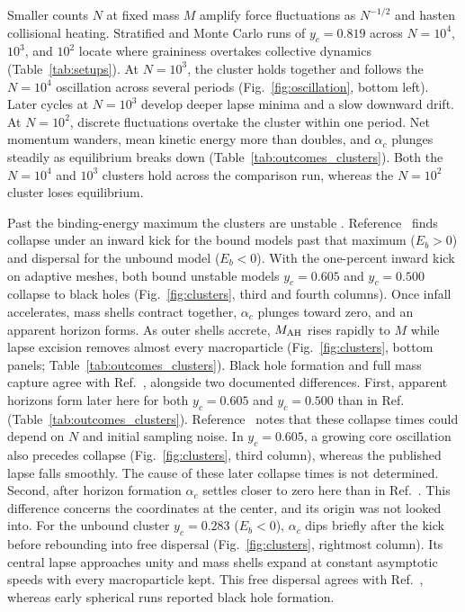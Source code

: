 Smaller counts $N$ at fixed mass $M$ amplify force fluctuations as $N^{-1/2}$ and hasten collisional heating. Stratified and Monte Carlo runs of $y_c = 0.819$ across $N = 10^4$, $10^3$, and $10^2$ locate where graininess overtakes collective dynamics (Table~\ref{tab:setups}). At $N = 10^3$, the cluster holds together and follows the $N = 10^4$ oscillation across several periods (Fig.~\ref{fig:oscillation}, bottom left). Later cycles at $N = 10^3$ develop deeper lapse minima and a slow downward drift. At $N = 10^2$, discrete fluctuations overtake the cluster within one period. Net momentum wanders, mean kinetic energy more than doubles, and $\alpha_c$ plunges steadily as equilibrium breaks down (Table~\ref{tab:outcomes_clusters}). Both the $N = 10^4$ and $10^3$ clusters hold across the comparison run, whereas the $N = 10^2$ cluster loses equilibrium.

Past the binding-energy maximum the clusters are unstable \cite{1980ApJ...238.1101I,1985ApJ...298...58S}. Reference~\cite{Wu:2026nrpic} finds collapse under an inward kick for the bound models past that maximum ($E_b > 0$) and dispersal for the unbound model ($E_b < 0$). With the one-percent inward kick on adaptive meshes, both bound unstable models $y_c = 0.605$ and $y_c = 0.500$ collapse to black holes (Fig.~\ref{fig:clusters}, third and fourth columns). Once infall accelerates, mass shells contract together, $\alpha_c$ plunges toward zero, and an apparent horizon forms. As outer shells accrete, $M_{\rm AH}$ rises rapidly to $M$ while lapse excision removes almost every macroparticle (Fig.~\ref{fig:clusters}, bottom panels; Table~\ref{tab:outcomes_clusters}). Black hole formation and full mass capture agree with Ref.~\cite{Wu:2026nrpic}, alongside two documented differences. First, apparent horizons form later here for both $y_c = 0.605$ and $y_c = 0.500$ than in Ref.~\cite{Wu:2026nrpic} (Table~\ref{tab:outcomes_clusters}). Reference~\cite{Wu:2026nrpic} notes that these collapse times could depend on $N$ and initial sampling noise. In $y_c = 0.605$, a growing core oscillation also precedes collapse (Fig.~\ref{fig:clusters}, third column), whereas the published lapse falls smoothly. The cause of these later collapse times is not determined. Second, after horizon formation $\alpha_c$ settles closer to zero here than in Ref.~\cite{Wu:2026nrpic}. This difference concerns the coordinates at the center, and its origin was not looked into. For the unbound cluster $y_c = 0.283$ ($E_b < 0$), $\alpha_c$ dips briefly after the kick before rebounding into free dispersal (Fig.~\ref{fig:clusters}, rightmost column). Its central lapse approaches unity and mass shells expand at constant asymptotic speeds with every macroparticle kept. This free dispersal agrees with Ref.~\cite{Wu:2026nrpic}, whereas early spherical runs \cite{1985ApJ...298...58S} reported black hole formation.

